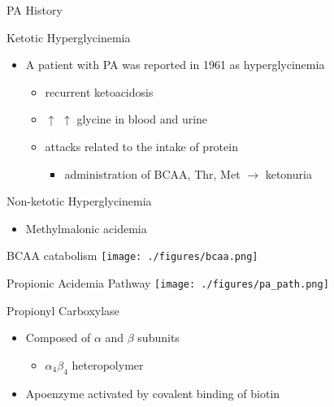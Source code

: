 \documentclass[presentation, smaller]{beamer}
\begin{document}
\begin{frame}[label={sec:orgheadline2}]{PA History}
\begin{block}{Ketotic Hyperglycinemia}
\begin{itemize}
\item A patient with PA was reported in 1961 as hyperglycinemia
\begin{itemize}
\item recurrent ketoacidosis
\item \(\uparrow\) \(\uparrow\) glycine in blood and urine
\item attacks related to the intake of protein
\begin{itemize}
\item administration of BCAA, Thr, Met \(\to\) ketonuria
\end{itemize}
\end{itemize}
\end{itemize}
\end{block}
\begin{block}{Non-ketotic Hyperglycinemia}
\begin{itemize}
\item Methylmalonic acidemia
\end{itemize}
\end{block}
\end{frame}

\begin{frame}[label={sec:orgheadline3}]{BCAA catabolism}
\centering
\texttt{[image: ./figures/bcaa.png]}
\end{frame}
\begin{frame}[label={sec:orgheadline4}]{Propionic Acidemia Pathway}
\texttt{[image: ./figures/pa\_path.png]}
\end{frame}

\begin{frame}[label={sec:orgheadline5}]{Propionyl Carboxylase}
\begin{itemize}
\item Composed of \(\alpha\) and \(\beta\) subunits
\begin{itemize}
\item \(\alpha_{\text{4}} \beta_{\text{4}}\) heteropolymer
\end{itemize}
\item Apoenzyme activated by covalent binding of biotin
\end{itemize}
\end{frame}
\end{document}
